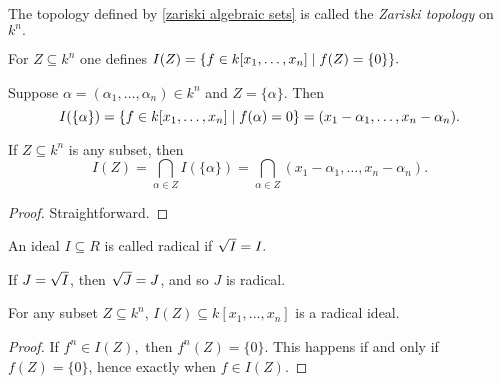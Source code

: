 \begin{df}
  The topology defined by \cref{zariski algebraic sets} is called the \emph{Zariski topology} on \(k^n.\)
\end{df}

\begin{df}
  For \(Z \subseteq k^n\) one defines
  \(I(Z) = \{f \in k[x_1, \dotsc, x_n] \mathrel{|} f(Z) = \{0\}\}.\)
\end{df}

\begin{example}
  Suppose \(\alpha = (\alpha_1, \dotsc, \alpha_n) \in k^n\) and \(Z = \{\alpha\}.\) Then \[I(\{\alpha\}) = \{f \in k[x_1, \dotsc, x_n] \mathrel{|} f(\alpha) = 0\} = (x_1 - \alpha_1, \dotsc, x_n - \alpha_n).\]
\end{example}

\begin{lemma}
  If \(Z \subseteq k^n\) is any subset, then
  \[I(Z) = \bigcap_{\alpha \in Z} I(\{\alpha\}) = \bigcap_{\alpha \in Z} (x_1 - \alpha_1, \dotsc, x_n - \alpha_n).\]
\end{lemma}
\begin{proof}
  Straightforward.
\end{proof}

\begin{df}
  An ideal \(I \subseteq R\) is called radical if \(\sqrt{I} = I.\)
\end{df}

If \(J = \sqrt{I}\), then \(\sqrt{J} = J\), and so \(J\) is radical.

\begin{lemma}
  For any subset \(Z \subseteq k^n\), \(I(Z) \subseteq k[x_1, \dotsc, x_n]\) is a radical ideal.
\end{lemma}
\begin{proof}
  If \(f^n \in I(Z),\) then \(f^n(Z)  = \{0\}\). This happens if and only if \(f(Z) = \{0\}\), hence exactly when \(f \in I(Z).\)
\end{proof}


